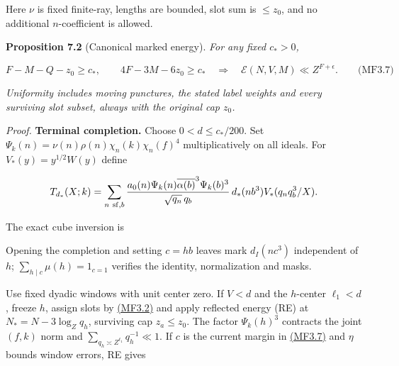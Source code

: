 Here \(\nu\) is fixed finite-ray, lengths are bounded, slot sum is \(\le z_0\), and no additional \(n\)-coefficient is allowed.

\textbf{Proposition 7.2} (Canonical marked energy). \emph{\hypertarget{mf:canonical-energy}{}\label{mf:canonical-energy} For any fixed \(c_*>0\), \hypertarget{mf:eq:B3.7}{}\label{mf:eq:B3.7}}

\[
F-M-Q-z_0\ge c_*,\qquad4F-3M-6z_0\ge c_*
\quad\Longrightarrow\quad
\mathcal E(N,V,M)\ll Z^{F+\epsilon}.
\qquad\text{(MF3.7)}
\]

\emph{Uniformity includes moving punctures, the stated label weights and every surviving slot subset, always with the original cap \(z_0\).}

\emph{Proof.} \textbf{Terminal completion.} Choose \(0<d\le c_*/200\). Set \(\Psi_k(n)=\nu(n)\rho(n)\chi_n(k)\chi_n(f)^4\) multiplicatively on all ideals. For \(V_*(y)=y^{1/2}W(y)\) define

\[
T_{d_*}(X;k)=\sum_{n\ {\rm sf},b}
 \frac{a_0(n)\Psi_k(n)\overline{\alpha(b)}^3\Psi_k(b)^3}
      {\sqrt{q_n}\,q_b}\,d_*(nb^3)V_*(q_nq_b^3/X).
\]

The exact cube inversion is

\hypertarget{mf:eq:B3.8}{}

\label{mf:eq:B3.8}

\par\noindent\resizebox{\linewidth}{!}{\begin{minipage}{\dimexpr\linewidth+33.08385pt\relax}\[
Z^{-N/2}\sum_{n\ {\rm sf}}a_0(n)\Psi_k(n)d_I(n)W(q_n/Z^N)
=\sum_h\frac{\mu(h)\overline{\alpha(h)}^3\Psi_k(h)^3}{q_h}
 T_{d_h}(Z^N/q_h^3;k),\quad d_h(A)=d_I(h^3A).
\qquad\text{(MF3.8)}
\]\end{minipage}}\par

Opening the completion and setting \(c=hb\) leaves mark \(d_I(nc^3)\) independent of \(h\); \(\sum_{h\mid c}\mu(h)=1_{c=1}\) verifies the identity, normalization and masks.

Use fixed dyadic windows with unit center zero. If \(V<d\) and the \(h\)-center \(\ell_1<d\), freeze \(h\), assign slots by \protect\hyperlink{mf:eq:B3.2}{(MF3.2)} and apply reflected energy (RE) at \(N_*=N-3\log_Zq_h\), surviving cap \(z_a\le z_0\). The factor \(\Psi_k(h)^3\) contracts the joint \((f,k)\) norm and \(\sum_{q_h\asymp Z^{\ell_1}}q_h^{-1}\ll1\). If \(c\) is the current margin in \protect\hyperlink{mf:eq:B3.7}{(MF3.7)} and \(\eta\) bounds window errors, RE gives

